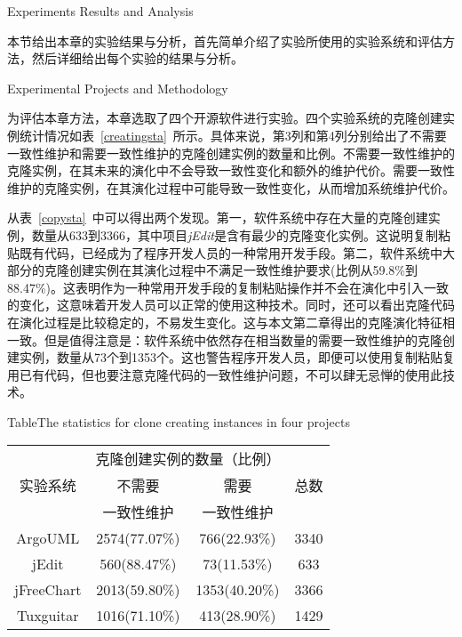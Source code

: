 {Experiments Results and Analysis}

本节给出本章的实验结果与分析，首先简单介绍了实验所使用的实验系统和评估方法，然后详细给出每个实验的结果与分析。

{Experimental Projects and Methodology}

为评估本章方法，本章选取了四个开源软件进行实验。四个实验系统的克隆创建实例统计情况如表~\ref{creatingsta}~所示。具体来说，第3列和第4列分别给出了不需要一致性维护和需要一致性维护的克隆创建实例的数量和比例。不需要一致性维护的克隆实例，在其未来的演化中不会导致一致性变化和额外的维护代价。需要一致性维护的克隆实例，在其演化过程中可能导致一致性变化，从而增加系统维护代价。

从表~\ref{copysta}~中可以得出两个发现。第一，软件系统中存在大量的克隆创建实例，数量从633到3366，其中项目{\em  jEdit}是含有最少的克隆变化实例。这说明复制粘贴既有代码，已经成为了程序开发人员的一种常用开发手段。第二，软件系统中大部分的克隆创建实例在其演化过程中不满足一致性维护要求(比例从59.8\%到88.47\%)。这表明作为一种常用开发手段的复制粘贴操作并不会在演化中引入一致的变化，这意味着开发人员可以正常的使用这种技术。同时，还可以看出克隆代码在演化过程是比较稳定的，不易发生变化。这与本文第二章得出的克隆演化特征相一致。但是值得注意是：软件系统中依然存在相当数量的需要一致性维护的克隆创建实例，数量从73个到1353个。这也警告程序开发人员，即便可以使用复制粘贴复用已有代码，但也要注意克隆代码的一致性维护问题，不可以肆无忌惮的使用此技术。

\begin{table}[htbp]
{Table$\!$}{The statistics for clone creating instances in four projects}
\vspace{0.5em}
\centering
\wuhao
\begin{tabular}{cccc}
\toprule[1.5pt]
\multirow{3}{*}{实验系统}& \multicolumn{2}{c}{克隆创建实例的数量（比例）} & \multirow{3}{*}{总数}\\
\cline{2-3}
~&{不需要} &{需要} &  ~\\
~&{一致性维护}&{一致性维护}&~ \\
\midrule[1pt]
ArgoUML&	2574(77.07\%)&	766(22.93\%)&	3340\\
jEdit&	560(88.47\%)&	73(11.53\%)&	633\\
jFreeChart&	2013(59.80\%)&	1353(40.20\%)&	3366\\
Tuxguitar&	1016(71.10\%)&	413(28.90\%)&	1429\\
\bottomrule[1.5pt]
\end{tabular}
\end{table}

